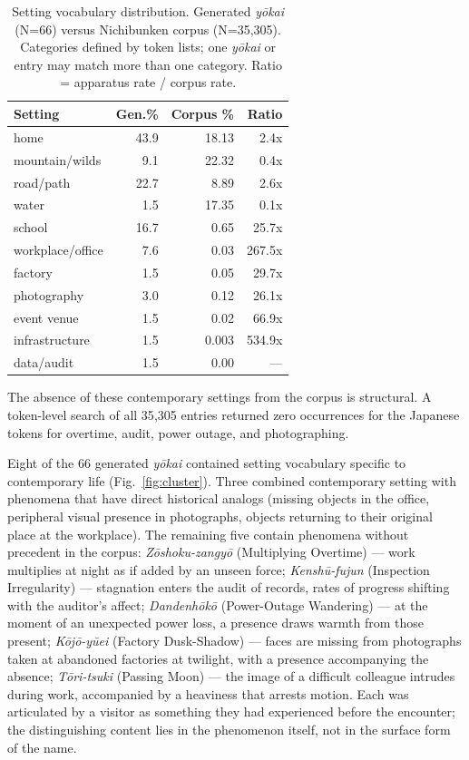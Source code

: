 \documentclass[manuscript,review,anonymous,nonacm]{acmart}
\begin{document}
\begin{table}[h]
\caption{Setting vocabulary distribution. Generated \textit{y\=okai} (N=66) versus Nichibunken corpus (N=35{,}305). Categories defined by token lists; one \textit{y\=okai} or entry may match more than one category. Ratio = apparatus rate / corpus rate.}
\label{tab:settings}
\small
\begin{tabular}{lrrr}
\hline
\textbf{Setting} & \textbf{Gen.\%} & \textbf{Corpus \%} & \textbf{Ratio} \\
\hline
home              & 43.9 & 18.13 & 2.4x \\
mountain/wilds    &  9.1 & 22.32 & 0.4x \\
road/path         & 22.7 &  8.89 & 2.6x \\
water             &  1.5 & 17.35 & 0.1x \\
school            & 16.7 &  0.65 & 25.7x \\
workplace/office  &  7.6 &  0.03 & 267.5x \\
factory           &  1.5 &  0.05 & 29.7x \\
photography       &  3.0 &  0.12 & 26.1x \\
event venue       &  1.5 &  0.02 & 66.9x \\
infrastructure    &  1.5 &  0.003 & 534.9x \\
data/audit        &  1.5 &  0.00 & --- \\
\hline
\end{tabular}
\end{table}

The absence of these contemporary settings from the corpus is structural. A token-level search of all 35{,}305 entries returned zero occurrences for the Japanese tokens for overtime, audit, power outage, and photographing.

Eight of the 66 generated \textit{y\=okai} contained setting vocabulary specific to contemporary life (Fig.~\ref{fig:cluster}). Three combined contemporary setting with phenomena that have direct historical analogs (missing objects in the office, peripheral visual presence in photographs, objects returning to their original place at the workplace). The remaining five contain phenomena without precedent in the corpus: \textit{Z\=oshoku-zangy\=o} (Multiplying Overtime) — work multiplies at night as if added by an unseen force; \textit{Kensh\=u-fujun} (Inspection Irregularity) — stagnation enters the audit of records, rates of progress shifting with the auditor's affect; \textit{Dandenh\=ok\=o} (Power-Outage Wandering) — at the moment of an unexpected power loss, a presence draws warmth from those present; \textit{K\=oj\=o-y\=uei} (Factory Dusk-Shadow) — faces are missing from photographs taken at abandoned factories at twilight, with a presence accompanying the absence; \textit{T\=ori-tsuki} (Passing Moon) — the image of a difficult colleague intrudes during work, accompanied by a heaviness that arrests motion. Each was articulated by a visitor as something they had experienced before the encounter; the distinguishing content lies in the phenomenon itself, not in the surface form of the name.
\end{document}
